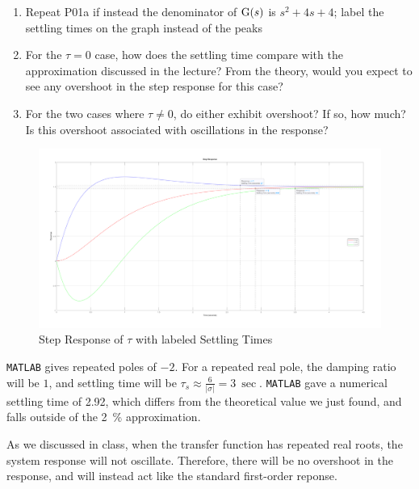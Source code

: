 \begin{hwkProblem}{2}{}

	\begin{enumerate}
		\item Repeat P01a if instead the denominator of \( \func{G}[s] \) is \( s^{2}+4s+4 \); label the settling times on the graph instead of the peaks
		\item For the \( \tau = 0 \) case, how does the settling time compare with the approximation discussed in the lecture? From the theory, would you expect to see any overshoot in the step response for this case?
		\item For the two cases where \( \tau \neq 0 \), do either exhibit overshoot? If so, how much? Is this overshoot associated with oscillations in the response?
	\end{enumerate}

	\hwkSol{}

	\hwkPart{}

	\begin{figure}[H]
		\begin{center}
			\includegraphics[width=\textwidth]{./images/s02a.png}
		\end{center}
		\caption{Step Response of \( \tau \) with labeled Settling Times}\label{fig:s02a}
	\end{figure}

	\hwkPart{}
	
	\lstinline{MATLAB} gives repeated poles of \( -2 \). For a repeated real pole, the damping ratio will be \( 1 \), and settling time will be \( \tau_{s} \approx \frac{6}{|\sigma|} = \qty{3}{\sec} \). \lstinline{MATLAB} gave a numerical settling time of \qty{2.92}{\sec}, which differs from the theoretical value we just found, and falls outside of the \qty{2}{\percent} approximation.

	As we discussed in class, when the transfer function has repeated real roots, the system response will not oscillate. Therefore, there will be no overshoot in the response, and will instead act like the standard first-order reponse.


\end{hwkProblem}
